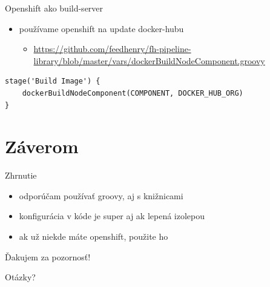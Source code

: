 \documentclass[bigger]{beamer}
\begin{document}
\begin{frame}[fragile,label={sec:org3c8d540}]{Openshift ako build-server}
 \begin{itemize}
\item používame openshift na update docker-hubu
\begin{itemize}
\item \url{https://github.com/feedhenry/fh-pipeline-library/blob/master/vars/dockerBuildNodeComponent.groovy}
\end{itemize}
\end{itemize}
\begin{verbatim}
stage('Build Image') {
    dockerBuildNodeComponent(COMPONENT, DOCKER_HUB_ORG)
}
\end{verbatim}
\end{frame}

\section{Záverom}
\label{sec:org8888dc9}

\begin{frame}[label={sec:orgad341ee}]{Zhrnutie}
\begin{itemize}
\item odporúčam používať groovy, aj s knižnicami
\item konfigurácia v kóde je super aj ak lepená izolepou
\item ak už niekde máte openshift, použite ho
\end{itemize}
\end{frame}

\begin{frame}[label={sec:org2e9084e}]{Ďakujem za pozornosť!}
\end{frame}

\begin{frame}[label={sec:orgd5b1ea3}]{Otázky?}
\end{frame}
\end{document}
